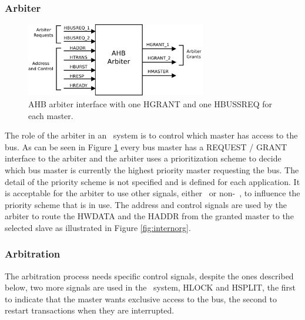 \subsubsection{Arbiter}
\begin{figure}[ht]
    \centering
    \includegraphics[width=0.7\textwidth]{figures/pdf/ahb_arbiter_new.pdf}
    \caption{AHB arbiter interface with one HGRANT and one HBUSSREQ for each master.}
    \label{fig:arbiterint}
\end{figure}

 The role of the arbiter in an \amba~system is to control which master has access to the bus. As can be seen in Figure \ref{fig:arbiterint} every bus master has a REQUEST / GRANT interface to the arbiter and the arbiter uses a prioritization scheme to decide which bus master is currently the highest priority master requesting the bus. The detail of the priority scheme is not specified and is defined for each application. It is acceptable for the arbiter to use other signals, either \amba~or non-\amba~, to influence the priority scheme that is in use.
 The address and control signals are used by the arbiter to route the HWDATA and the HADDR from the granted master to the selected slave as illustrated in Figure     \ref{fig:internorg}.
 
 
 \subsubsection{Arbitration}
 
 The arbitration process needs specific control signals, despite the ones described below, two more signals are used in the \amba~system, HLOCK and HSPLIT,  the first to indicate that the master wants exclusive access to the bus, the second to restart transactions when they are interrupted.
 
